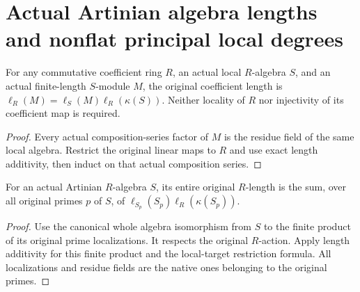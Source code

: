 \section{Actual Artinian algebra lengths and nonflat principal local degrees}

\begin{theorem}
\label{thm:fc-artinian-local-restriction-length}
\leanok
{}
For any commutative coefficient ring $R$, an actual local $R$-algebra $S$,
and an actual finite-length $S$-module $M$, the original coefficient length is
$\ell_R(M)=\ell_S(M)\ell_R(\kappa(S))$.  Neither locality of $R$ nor
injectivity of its coefficient map is required.
\end{theorem}
\begin{proof}
Every actual composition-series factor of $M$ is the residue field of the
same local algebra.  Restrict the original linear maps to $R$ and use exact
length additivity, then induct on that actual composition series.
\end{proof}

\begin{theorem}
\label{thm:fc-artinian-algebra-local-lengths}
\leanok
{}
For an actual Artinian $R$-algebra $S$, its entire original $R$-length is the
sum, over all original primes $p$ of $S$, of
$\ell_{S_p}(S_p)\ell_R(\kappa(S_p))$.
\end{theorem}
\begin{proof}
Use the canonical whole algebra isomorphism from $S$ to the finite product
of its original prime localizations.  It respects the original $R$-action.
Apply length additivity for this finite product and the local-target
restriction formula.  All localizations and residue fields are the native
ones belonging to the original primes.
\end{proof}

